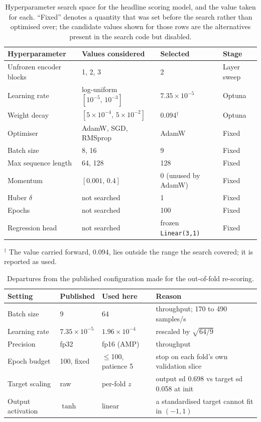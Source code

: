 \begin{table}[htbp]
\centering
\caption{Hyperparameter search space for the headline scoring model, and the value taken for each. ``Fixed'' denotes a quantity that was set before the search rather than optimised over; the candidate values shown for those rows are the alternatives present in the search code but disabled.}
\label{tab:finbert_hparams_space}
\begin{tabular}{llll}
\hline
Hyperparameter & Values considered & Selected & Stage \\
\hline
        Unfrozen encoder blocks & 1, 2, 3 & 2 & Layer sweep \\
        Learning rate & log-uniform $[10^{-5},\,10^{-3}]$ & $7.35\times10^{-5}$ & Optuna \\
        Weight decay & $[5\times10^{-4},\,5\times10^{-2}]$ & 0.094$^{\dagger}$ & Optuna \\
        Optimiser & AdamW, SGD, RMSprop & AdamW & Fixed \\
        Batch size & 8, 16 & 9 & Fixed \\
        Max sequence length & 64, 128 & 128 & Fixed \\
        Momentum & $[0.001,\,0.4]$ & 0 (unused by AdamW) & Fixed \\
        Huber $\delta$ & not searched & 1 & Fixed \\
        Epochs & not searched & 100 & Fixed \\
        Regression head & not searched & frozen \texttt{Linear(3,1)} & Fixed \\
\hline
\end{tabular}
\par\smallskip
\footnotesize $^{\dagger}$ The value carried forward, 0.094, lies outside the range the search covered; it is reported as used.
\end{table}

\begin{table}[htbp]
\centering
\caption{Departures from the published configuration made for the out-of-fold re-scoring.}
\label{tab:finbert_hparams_changes}
\begin{tabular}{llll}
\hline
Setting & Published & Used here & Reason \\
\hline
        Batch size & 9 & 64 & throughput; 170 to 490 samples/s \\
        Learning rate & $7.35\times10^{-5}$ & $1.96\times10^{-4}$ & rescaled by $\sqrt{64/9}$ \\
        Precision & fp32 & fp16 (AMP) & throughput \\
        Epoch budget & 100, fixed & $\leq$100, patience 5 & stop on each fold's own validation slice \\
        Target scaling & raw & per-fold $z$ & output sd 0.698 vs target sd 0.058 at init \\
        Output activation & $\tanh$ & linear & a standardised target cannot fit in $(-1,1)$ \\
\hline
\end{tabular}
\end{table}

